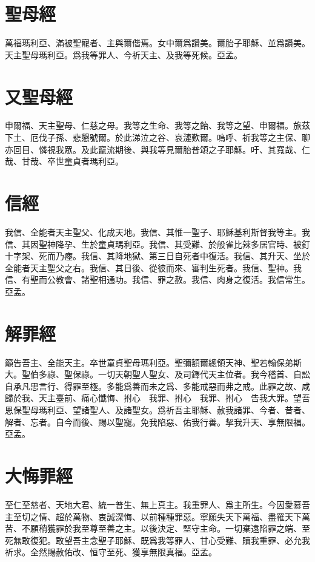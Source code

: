 \section*{聖母經}
萬福瑪利亞、滿被聖寵者、主與爾偕焉。女中爾爲讚美。爾胎子耶穌、並爲讚美。 天主聖母瑪利亞。爲我等罪人、今祈天主、及我等死候。{\cspace}亞孟。

\section*{又聖母經}
申爾福、天主聖母、仁慈之母。我等之生命、我等之飴、我等之望、申爾福。旅茲下土、厄伐子孫、悲懇號爾。於此涕泣之谷、哀漣歎爾。嗚呼、祈我等之主保、聊亦回目、憐視我眾。及此竄流期後、與我等見爾胎普頌之子耶穌。吁、其寬哉、仁哉、甘哉、卒世童貞者瑪利亞。

\section*{信經}
我信、全能者天主聖父、化成天地。我信、其惟一聖子、耶穌基利斯督我等主。我信、其因聖神降孕、生於童貞瑪利亞。我信、其受難、於般雀比辣多居官時、被釘十字架、死而乃瘞。我信、其降地獄、第三日自死者中復活。我信、其升天、坐於全能者天主聖父之右。我信、其日後、從彼而來、審判生死者。我信、聖神。我信、有聖而公教會、諸聖相通功。我信、罪之赦。我信、肉身之復活。我信常生。{\cspace}亞孟。

\section*{解罪經}
籲告吾主、全能天主。卒世童貞聖母瑪利亞。聖彌額爾總領天神、聖若翰保弟斯大。聖伯多祿、聖保祿。一切天朝聖人聖女、及司鐸代天主位者。我今稽首、自訟自承凡思言行、得罪至極。多能爲善而未之爲、多能戒惡而弗之戒。此罪之故、咸歸於我、天主臺前、痛心懺悔、{\small 拊心}\ \ 我罪、{\small 拊心}\ \ 我罪、{\small 拊心}\ \ 告我大罪。望吾恩保聖母瑪利亞、望諸聖人、及諸聖女。爲祈吾主耶穌、赦我諸罪、今者、昔者、解者、忘者。自今而後、賜以聖寵。免我陷惡、佑我行善。挈我升天、享無限福。{\cspace}亞孟。

\section*{大悔罪經}
至仁至慈者、天地大君、統一普生、無上真主。我重罪人、爲主所生。今因愛慕吾主至切之情、超於萬物、衷誠深悔、以前種種罪惡。寧願失天下萬福、盡罹天下萬苦、不願稍獲罪於我至尊至善之主。以後決定、堅守主命。一切棄遠陷罪之端、至死無敢復犯。敢望吾主念聖子耶穌、既爲我等罪人、甘心受難、贖我重罪、必允我祈求。全然賜赦佑改、恒守至死、獲享無限真福。{\cspace}亞孟。

